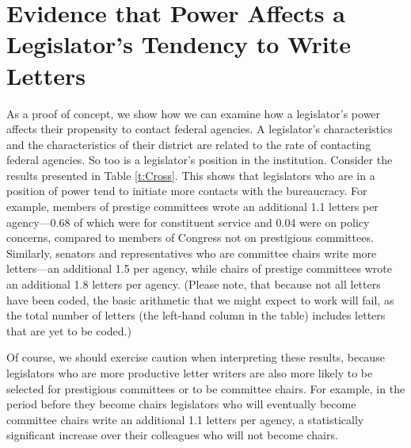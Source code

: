 \documentclass{article}
\begin{document}
\section{Evidence that Power Affects a Legislator's Tendency to Write Letters}



As a proof of concept, we show how we can examine how a legislator's power affects their propensity to contact federal agencies.  A legislator's characteristics and the characteristics of their district are related to the rate of contacting federal agencies.  So too is a legislator's position in the institution.  Consider the results presented in Table \ref{t:Cross}.  This shows that legislators who are in a position of power tend to initiate more contacts with the bureaucracy.  For example, members of prestige committees wrote an additional 1.1 letters per agency---0.68 of which were for constituent service and 0.04 were on policy concerns, compared to members of Congress not on prestigious committees.  Similarly, senators and representatives who are committee chairs write more letters---an additional 1.5 per agency, while chairs of prestige committees wrote an additional 1.8 letters per agency.  (Please note, that because not all letters have been coded, the basic arithmetic that we might expect to work will fail, as the total number of letters (the left-hand column in the table) includes letters that are yet to be coded.)

Of course, we should exercise caution when interpreting these results, because legislators who are more productive letter writers are also more likely to be selected for prestigious committees or to be committee chairs.  For example, in the period before they become chairs legislators who will eventually become committee chairs write an additional 1.1 letters per agency, a statistically significant increase over their colleagues who will not become chairs.  
\end{document}
